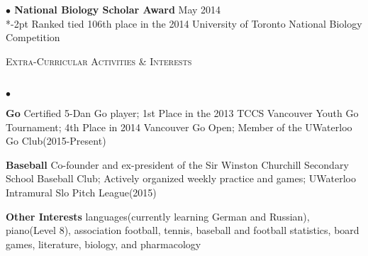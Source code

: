 \documentclass{article}
\newcommand{\lineunder}{\vspace*{-8pt} \\ \hspace*{-18pt} \hrulefill \\}
\newcommand{\header}[1]{{\hspace*{-15pt}\vspace*{6pt} \textsc{#1}} \vspace*{-6pt} \lineunder}
\newenvironment{achievements}{\begin{list}{$\bullet$}{\topsep 0pt \itemsep -2pt}}{\vspace*{4pt}\end{list}}
\newcommand{\award}[3]{\textbf{$\bullet$ \hspace{2bp}#1} \hfill{#2} \\ \vspace{2pt}
}
\begin{document}
\award{National Biology Scholar Award}{May 2014}

\vspace*{-2pt}
\hspace{8bp}
Ranked tied 106th place in the 2014 University of Toronto National Biology Competition

\vspace*{5pt}

\header{Extra-Curricular Activities \& Interests}
\begin{achievements}
\item \textbf{Go} \hspace{3bp}Certified 5-Dan Go player; 1st Place in the 2013 TCCS Vancouver Youth Go Tournament; 4th Place in 2014 Vancouver Go Open; Member of the UWaterloo Go Club(2015-Present)
\item \textbf{Baseball}	\hspace{3bp}Co-founder and ex-president of the Sir Winston Churchill Secondary School Baseball Club; Actively organized weekly practice and games; UWaterloo Intramural Slo Pitch League(2015)
\item \textbf{Other Interests} \hspace{3bp}languages(currently learning German and Russian), piano(Level 8), association football, tennis, baseball and football statistics, board games, literature, biology, and pharmacology
\end{achievements}
\end{document}
